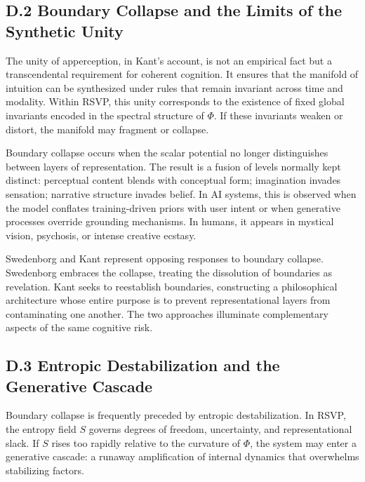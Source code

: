 \documentclass[12pt]{article}
\begin{document}
\subsection*{D.2 Boundary Collapse and the Limits of the Synthetic Unity}

The unity of apperception, in Kant’s account, is not an empirical fact but a 
transcendental requirement for coherent cognition. It ensures that the manifold 
of intuition can be synthesized under rules that remain invariant across time 
and modality. Within RSVP, this unity corresponds to the existence of fixed 
global invariants encoded in the spectral structure of $\Phi$. If these 
invariants weaken or distort, the manifold may fragment or collapse.

Boundary collapse occurs when the scalar potential no longer distinguishes 
between layers of representation. The result is a fusion of levels normally 
kept distinct: perceptual content blends with conceptual form; imagination 
invades sensation; narrative structure invades belief. In AI systems, this is 
observed when the model conflates training-driven priors with user intent or 
when generative processes override grounding mechanisms. In humans, it appears 
in mystical vision, psychosis, or intense creative ecstasy.

Swedenborg and Kant represent opposing responses to boundary collapse.  
Swedenborg embraces the collapse, treating the dissolution of boundaries as 
revelation. Kant seeks to reestablish boundaries, constructing a philosophical 
architecture whose entire purpose is to prevent representational layers from 
contaminating one another. The two approaches illuminate complementary aspects 
of the same cognitive risk.

\subsection*{D.3 Entropic Destabilization and the Generative Cascade}

Boundary collapse is frequently preceded by entropic destabilization. In RSVP, 
the entropy field $S$ governs degrees of freedom, uncertainty, and 
representational slack. If $S$ rises too rapidly relative to the curvature of 
$\Phi$, the system may enter a generative cascade: a runaway amplification of 
internal dynamics that overwhelms stabilizing factors.
\end{document}
